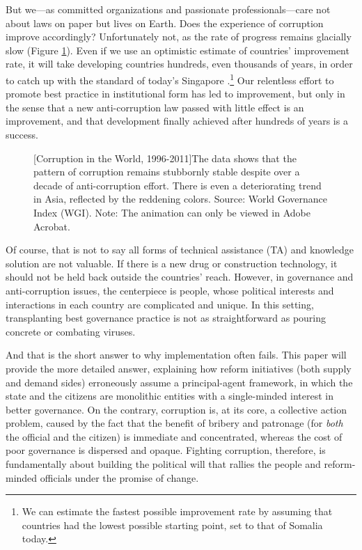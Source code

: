 \documentclass[12pt]{article}
\begin{document}
But we---as committed organizations and passionate professionals---care not about laws on paper but lives on Earth. Does the experience of corruption improve accordingly? Unfortunately not, as the rate of progress remains glacially slow (Figure \ref{fig:worldcorruption}). Even if we use an optimistic estimate of countries' improvement rate, it will take developing countries hundreds, even thousands of years, in order to catch up with the standard of today's Singapore \citep{Pritchett2010}.\footnote{We can estimate the fastest possible improvement rate by assuming that countries had the lowest possible starting point, set to that of Somalia today.} Our relentless effort to promote best practice in institutional form has led to improvement, but only in the sense that a new anti-corruption law passed with little effect is an improvement, and that development finally achieved after hundreds of years is a success.

\begin{figure}
\centering
{}
[Corruption in the World, 1996-2011]{The data shows that the pattern of corruption remains stubbornly stable despite over a decade of anti-corruption effort. There is even a deteriorating trend in Asia, reflected by the reddening colors. Source: World Governance Index (WGI). Note: The animation can only be viewed in Adobe Acrobat.}
\label{fig:worldcorruption}
\end{figure}

Of course, that is not to say all forms of technical assistance (TA) and knowledge solution are not valuable. If there is a new drug or construction technology, it should not be held back outside the countries' reach. However, in governance and anti-corruption issues, the centerpiece is people, whose political interests and interactions in each country are complicated and unique. In this setting, transplanting best governance practice is not as straightforward as pouring concrete or combating viruses.

And that is the short answer to why implementation often fails. This paper will provide the more detailed answer, explaining how reform initiatives (both supply and demand sides) erroneously assume a principal-agent framework, in which the state and the citizens are monolithic entities with a single-minded interest in better governance. On the contrary, corruption is, at its core, a collective action problem, caused by the fact that the benefit of bribery and patronage (for \textit{both} the official and the citizen) is immediate and concentrated, whereas the cost of poor governance is dispersed and opaque. Fighting corruption, therefore, is fundamentally about building the political will that rallies the people and reform-minded officials under the promise of change.
\end{document}
